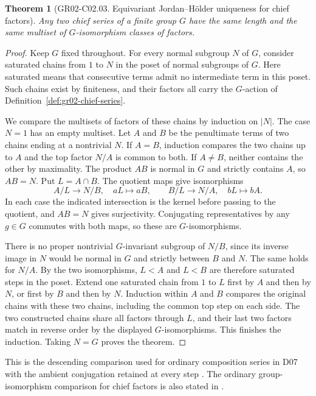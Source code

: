 \documentclass[11pt,oneside,openany]{book}
\newtheorem{theorem}{Theorem}[chapter]
\theoremstyle{definition}
\theoremstyle{remark}
\begin{document}
\begin{theorem}[GR02-C02.03. Equivariant Jordan--H\"older uniqueness for chief factors]
\label{thm:gr02-chief-uniqueness}
Any two chief series of a finite group \(G\) have the same length
and the same multiset of \(G\)-isomorphism classes of factors.
\end{theorem}
\begin{proof}
Keep \(G\) fixed throughout. For every normal subgroup \(N\) of
\(G\), consider saturated chains from \(1\) to \(N\) in the poset
of normal subgroups of \(G\). Here saturated means that consecutive
terms admit no intermediate term in this poset. Such chains exist
by finiteness, and their factors all carry the \(G\)-action of
Definition~\ref{def:gr02-chief-series}.

We compare the multisets of factors of these chains by induction on
\(|N|\). The case \(N=1\) has an empty multiset. Let \(A\) and \(B\)
be the penultimate terms of two chains ending at a nontrivial
\(N\). If \(A=B\), induction compares the two chains up to \(A\)
and the top factor \(N/A\) is common to both. If \(A\ne B\), neither
contains the other by maximality. The product \(AB\) is normal in
\(G\) and strictly contains \(A\), so \(AB=N\). Put \(L=A\cap B\).
The quotient maps give isomorphisms
\[
  A/L \longrightarrow N/B,\quad aL\longmapsto aB,
  \qquad
  B/L \longrightarrow N/A,\quad bL\longmapsto bA.
\]
In each case the indicated intersection is the kernel before
passing to the quotient, and \(AB=N\) gives surjectivity.
Conjugating representatives by any \(g\in G\) commutes with both
maps, so these are \(G\)-isomorphisms.

There is no proper nontrivial \(G\)-invariant subgroup of \(N/B\),
since its inverse image in \(N\) would be normal in \(G\) and
strictly between \(B\) and \(N\). The same holds for \(N/A\).
By the two isomorphisms, \(L<A\) and \(L<B\) are therefore saturated
steps in the poset. Extend one saturated chain from \(1\) to \(L\)
first by \(A\) and then by \(N\), or first by \(B\) and then by \(N\).
Induction within \(A\) and \(B\) compares the original chains with
these two chains, including the common top step on each side.
The two constructed chains share all factors through \(L\), and
their last two factors match in reverse order by the displayed
\(G\)-isomorphisms. This finishes the induction. Taking \(N=G\)
proves the theorem.
\end{proof}

This is the descending comparison used for ordinary composition
series in D07 with the ambient conjugation retained at every step
\cite[entry K07.06.jordan\_holder\_extension]{d07}. The ordinary
group-isomorphism comparison for chief factors is also stated in
\cite[Theorem~5.9]{chief-source}.
\end{document}
